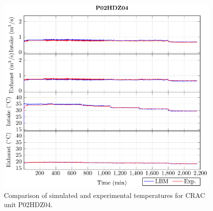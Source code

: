 \documentclass[border=10pt,preview]{standalone}
\begin{document}
\clearpage

\begin{figure}[!htb]
\centering
\includegraphics[width=\linewidth]{Plots/P02HDZ04_T.pdf}
\caption{Comparison of simulated and experimental temperatures for CRAC unit P02HDZ04.}
\label{fig:P02HDZ04_plot}
\end{figure}


\clearpage
\end{document}
